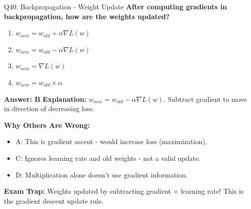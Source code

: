 \documentclass[8pt]{beamer}
\begin{document}
	\begin{frame}{Q40: Backpropagation - Weight Update}
		\fontsize{6.5}{7.5}\selectfont
		\textbf{After computing gradients in backpropagation, how are the weights updated?}
		
		\begin{enumerate}
			\item $w_{new} = w_{old} + \alpha \nabla L(w)$
			\item $w_{new} = w_{old} - \alpha \nabla L(w)$
			\item $w_{new} = \nabla L(w)$
			\item $w_{new} = w_{old} \times \alpha$
		\end{enumerate}
		
		\vspace{0.05cm}
		\textcolor{myblue}{\textbf{Answer: B}}
		\vspace{0.05cm}
		\textcolor{myblue}{\textbf{Explanation:}} $w_{new} = w_{old} - \alpha \nabla L(w)$. Subtract gradient to move in direction of decreasing loss.
		
		\vspace{0.05cm}
		\textcolor{myred}{\textbf{Why Others Are Wrong:}}
		\begin{itemize}
			\item \textcolor{myred}{A:} This is gradient ascent - would increase loss (maximization).
			\item \textcolor{myred}{C:} Ignores learning rate and old weights - not a valid update.
			\item \textcolor{myred}{D:} Multiplication alone doesn't use gradient information.
		\end{itemize}
		
		\textcolor{myred}{\textbf{Exam Trap:}} Weights updated by \textcolor{myblue}{subtracting} gradient $\times$ learning rate! This is the gradient descent update rule.
	\end{frame}
	
\end{document}
